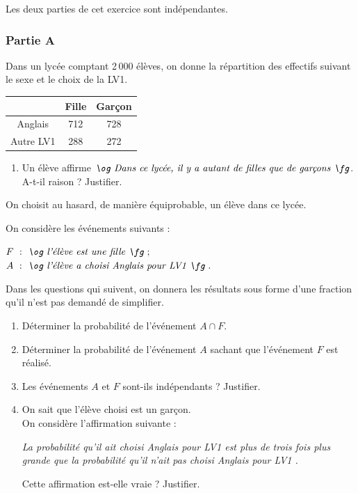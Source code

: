 \begin{center}
Les deux parties de cet exercice sont indépendantes.
\end{center}

\subsubsection*{Partie A}
Dans un lycée comptant 2\,000 élèves, on donne la répartition des effectifs suivant le sexe et le choix de la LV1.

\begin{center}
\begin{tabular}{|c|c|c|}
\hline
 & Fille & Garçon \\
\hline
Anglais & 712 & 728 \\
\hline
Autre LV1 & 288 & 272 \\
\hline
\end{tabular}
\end{center}

\begin{enumerate}
\item Un élève affirme $\textit{\og Dans ce lycée, il y a autant de filles que de garçons \fg}$. A-t-il raison ? Justifier.
\end{enumerate}

On choisit au hasard, de manière équiprobable, un élève dans ce lycée.

On considère les événements suivants :

$F~:~\textit{\og l'élève est une fille \fg}~;$ \\
$A~:~\textit{\og l'élève a choisi Anglais pour LV1 \fg}~.$

Dans les questions qui suivent, on donnera les résultats sous forme d'une fraction qu'il n'est pas demandé de simplifier.

\begin{enumerate}[resume]
\item Déterminer la probabilité de l'événement $A \cap F$.

\item Déterminer la probabilité de l'événement $A$ sachant que l'événement $F$ est réalisé.

\item Les événements $A$ et $F$ sont-ils indépendants ? Justifier.

\item On sait que l'élève choisi est un garçon. \\
On considère l'affirmation suivante :

\noindent\begin{minipage}{\linewidth}
\itshape\og La probabilité qu'il ait choisi Anglais pour LV1 est plus de trois fois plus grande que la probabilité qu'il n'ait pas choisi Anglais pour LV1 \fg.
\end{minipage}

Cette affirmation est-elle vraie ? Justifier.
\end{enumerate}

